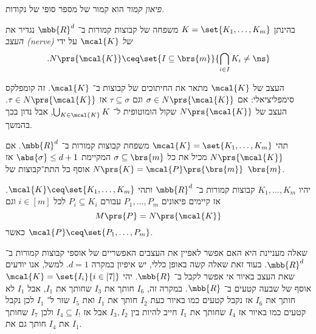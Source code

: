 \documentclass[a4paper,10pt,twoside,openany]{book}
\begin{document}
\begin{definition}
\emph{פיאון קמור}
הוא קמור של מספר סופי של נקודות.
\end{definition}

\begin{definition}[עצב]
בהינתן
$K = \set{K_1, \ldots, K_m}$
משפחה של קבוצות קמורות ב־%
$\mbb{R}^d$
נגדיר את
\emph{העצב \textenglish{(nerve)}
של
$\mcal{K}$}
על ידי
\[\text{.} N\prs{\mcal{K}} \ceq \set{I \subseteq \brs{m}}{\bigcap_{i \in I} K_i \neq \ns}\]
\end{definition}

\begin{remark}
העצב של
$\mcal{K}$
מתאר את החיתוכים של קבוצות ב־%
$\mcal{K}$.
זה קומפלקס סימפליציאלי: אם
$\sigma \in N\prs{\mcal{K}}$
וגם
$\tau \subseteq \sigma$
אז
$\tau \in N\prs{\mcal{K}}$.
העצב של
$N\prs{\mcal{K}}$
שקול הומוטופית ל־%
$\bigcup_{K \in \mcal{K}} K$,
אבל נדון בכך בהמשך.
\end{remark}

\begin{theorem}
תהי
$\mcal{K} = \set{K_1, \ldots, K_m}$
משפחת קבוצות קמורות ב־%
$\mbb{R}^d$.
אם
$N\prs{\mcal{K}}$
מכיל את כל
$\sigma \subseteq \brs{m}$
המקיימת
$\abs{\sigma} \leq d+1$
אז
$N\prs{K} = \mcal{P}\prs{\brs{m}}$
אוסף כל התת־קבוצות של
$\brs{m}$.
\end{theorem}

\begin{proposition}\label{proposition:polytopes-nerve}
יהיו
$K_1, \ldots, K_m$
קבוצות קמורות ב־%
$\mbb{R}^d$
ותהי
$\mcal{K} \ceq \set{K_1, \ldots, K_m}$.
אז קיימים פיאונים
$P_1, \ldots, P_m$
עבורם
$P_i \subseteq K_i$
לכל
$i \in [m]$
וגם
\[M\prs{P} = N\prs{\mcal{K}}\]
כאשר
$\mcal{P} \ceq \set{P_1, \ldots, P_m}$.
\end{proposition}

\begin{remark}
שאלה מעניינת היא האם אפשר לאפיין את העצבים האפשריים של אוספי קבוצות קמורות ב־%
$\mbb{R}^d$.
בעוד זאת שאלה קשה באופן כללי, יש איפיון במקרה
$d = 1$.
למשל, אנו יודעים שאת העצב באיור
אי אפשר לקבל ב־%
$\mbb{R}$.
יהי
$\mcal{K} = \set{I_i}{i \in [7]}$
אוסף של שבעה קטעים ב־%
$\mbb{R}$.
במקרה זה,
$I_6$
חותך את
$I_3$
שחותך את
$I_1$,
אבל
$I_1$
לא חותך את
$I_6$
אז נקבל קטעים כמו באיור
כעת
$I_2$
חותך את
$I_1$
ואת
$I_5$
שזר ל־%
$I_1$
לכן נקבל קטעים כמו באיור
אז
$I_4$
שחותך את
$I_1$
חייב להיות בין
$I_3, I_2$
אבל אז
$I_4 \subseteq I_!$
ולכן
$I_7$
שחותך את
$I_4$
חותך גם את
$I_1$.
\end{remark}
\end{document}
